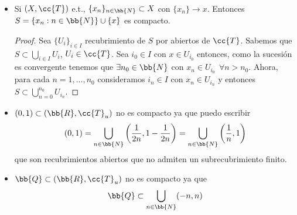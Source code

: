 \begin{ejemplo}\
    \begin{itemize}
        \item Si $(X, \cc{T})$ e.t., $\{x_n\}_{n\in \bb{N}}\subset X$ con $\{x_n\}\to x$. Entonces $S=\{x_n:n\in \bb{N}\}\cup\{x\}$ es compacto.
        \begin{proof}
            Sea $\{U_i\}_{i\in I}$ recubrimiento de $S$ por abiertos de $\cc{T}$. Sabemos que $S\subset \bigcup_{i\in I}U_i$, $U_i\in \cc{T}$. Sea $i_0\in I$ con $x\in U_{i_0}$ entonces, como la sucesión es convergente tenemos que $\exists n_0\in \bb{N}$ con $x_n\in U_{i_0}\ \ \forall n>n_0$. Ahora, para cada $n=1,\dots,n_0$ consideramos $i_n\in I$ con $x_n\in U_{i_n}$ y entonces $S\subset \bigcup_{n=0}^{n_0}U_{i_n}$.

        \end{proof}
        \item $(0,1)\subset (\bb{R}, \cc{T}_u)$ no es compacto ya que puedo escribir
        \begin{align*}
            (0,1)=\bigcup\limits_{n\in \bb{N}}\left(\frac{1}{2n}, 1 - \frac{1}{2n}\right) = \bigcup\limits_{n\in \bb{N}} \left(\frac{1}{n}, 1\right)
        \end{align*}
        que son recubrimientos abiertos que no admiten un subrecubrimiento finito.
        \item $\bb{Q}\subset (\bb{R}, \cc{T}_u)$ no es compacto ya que 
        \begin{align*}
            \bb{Q}\subset \bigcup\limits_{n\in \bb{N}}(-n,n)
        \end{align*}
    \end{itemize}
\end{ejemplo}

